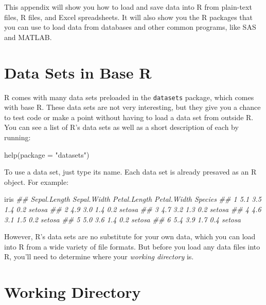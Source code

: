 \documentclass[
  letterpaper,
  DIV=11,
  numbers=noendperiod]{scrbook}
\newenvironment{Shaded}{\begin{snugshade}}{\end{snugshade}}
\newcommand{\AttributeTok}[1]{\textcolor[rgb]{0.40,0.45,0.13}{#1}}
\newcommand{\DocumentationTok}[1]{\textcolor[rgb]{0.37,0.37,0.37}{\textit{#1}}}
\newcommand{\FunctionTok}[1]{\textcolor[rgb]{0.28,0.35,0.67}{#1}}
\newcommand{\NormalTok}[1]{\textcolor[rgb]{0.00,0.23,0.31}{#1}}
\newcommand{\StringTok}[1]{\textcolor[rgb]{0.13,0.47,0.30}{#1}}
\begin{document}
This appendix will show you how to load and save data into R from
plain-text files, R files, and Excel spreadsheets. It will also show you
the R packages that you can use to load data from databases and other
common programs, like SAS and MATLAB.

\section{Data Sets in Base R}\label{data-sets-in-base-r}

R comes with many data sets preloaded in the \texttt{datasets} package,
which comes with base R. These data sets are not very interesting, but
they give you a chance to test code or make a point without having to
load a data set from outside R. You can see a list of R's data sets as
well as a short description of each by running:

\begin{Shaded}
\begin{Highlighting}[]
\FunctionTok{help}\NormalTok{(}\AttributeTok{package =} \StringTok{"datasets"}\NormalTok{)}
\end{Highlighting}
\end{Shaded}

To use a data set, just type its name. Each data set is already presaved
as an R object. For example:

\begin{Shaded}
\begin{Highlighting}[]
\NormalTok{iris}
\DocumentationTok{\#\#   Sepal.Length Sepal.Width Petal.Length Petal.Width Species}
\DocumentationTok{\#\# 1          5.1         3.5          1.4         0.2  setosa}
\DocumentationTok{\#\# 2          4.9         3.0          1.4         0.2  setosa}
\DocumentationTok{\#\# 3          4.7         3.2          1.3         0.2  setosa}
\DocumentationTok{\#\# 4          4.6         3.1          1.5         0.2  setosa}
\DocumentationTok{\#\# 5          5.0         3.6          1.4         0.2  setosa}
\DocumentationTok{\#\# 6          5.4         3.9          1.7         0.4  setosa}
\end{Highlighting}
\end{Shaded}

However, R's data sets are no substitute for your own data, which you
can load into R from a wide variety of file formats. But before you load
any data files into R, you'll need to determine where your \emph{working
directory} is.

\section{Working Directory}\label{working-directory}
\end{document}
